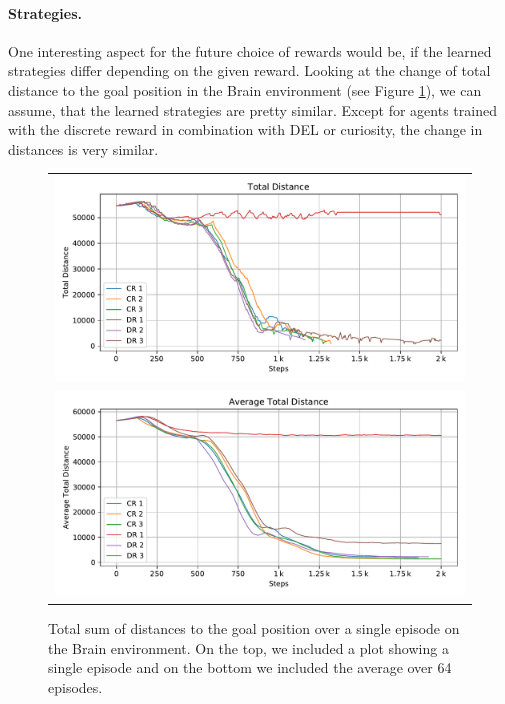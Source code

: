 \paragraph{Strategies.}
One interesting aspect for the future choice of rewards would be, if the learned strategies differ depending on the given reward. Looking at the change of total distance to the goal position in the Brain environment (see Figure \ref{fig:Rewards/Ep_Analysis}), we can assume, that the learned strategies are pretty similar. Except for agents trained with the discrete reward in combination with DEL or curiosity, the change in distances is very similar.  

\begin{figure}[htp]
    \begin{center}
        \begin{tabular}{c}
            \includegraphics[clip, width=0.95\columnwidth]{figures/evaluation/rewards/episode_analysis/maze0122_total_dist.pdf} \\
            \includegraphics[clip, width=0.95\columnwidth]{figures/evaluation/rewards/episode_analysis/maze0122_total_dist_avg.pdf} \\
        \end{tabular}
    \end{center}
    \caption[Episode metrics on the Brain Environment]{Total sum of distances to the goal position over a single episode on the Brain environment. On the top, we included a plot showing a single episode and on the bottom we included the average over 64 episodes.} \label{fig:Rewards/Ep_Analysis}
\end{figure}


